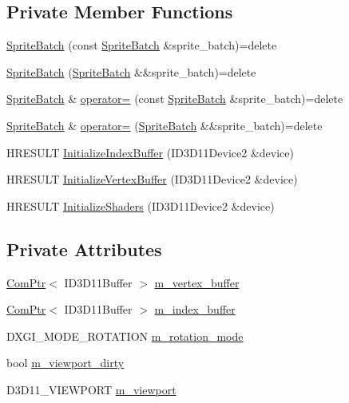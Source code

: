 \subsection*{Private Member Functions}
\begin{DoxyCompactItemize}
\item 
\hyperlink{classmage_1_1_sprite_batch_a10fe1d6cf1d2de9e087b370e7d696be8}{Sprite\+Batch} (const \hyperlink{classmage_1_1_sprite_batch}{Sprite\+Batch} \&sprite\+\_\+batch)=delete
\item 
\hyperlink{classmage_1_1_sprite_batch_a270604c9a535cc4fde6e5ff32b58618f}{Sprite\+Batch} (\hyperlink{classmage_1_1_sprite_batch}{Sprite\+Batch} \&\&sprite\+\_\+batch)=delete
\item 
\hyperlink{classmage_1_1_sprite_batch}{Sprite\+Batch} \& \hyperlink{classmage_1_1_sprite_batch_aa2a5df588d7589a36b38b35dc8a08a48}{operator=} (const \hyperlink{classmage_1_1_sprite_batch}{Sprite\+Batch} \&sprite\+\_\+batch)=delete
\item 
\hyperlink{classmage_1_1_sprite_batch}{Sprite\+Batch} \& \hyperlink{classmage_1_1_sprite_batch_ad46c172200bf47c10fa13fb3a70a4104}{operator=} (\hyperlink{classmage_1_1_sprite_batch}{Sprite\+Batch} \&\&sprite\+\_\+batch)=delete
\item 
H\+R\+E\+S\+U\+LT \hyperlink{classmage_1_1_sprite_batch_ae9625c709af19d244d9b7739f64591ed}{Initialize\+Index\+Buffer} (I\+D3\+D11\+Device2 \&device)
\item 
H\+R\+E\+S\+U\+LT \hyperlink{classmage_1_1_sprite_batch_aeb80ebc6472c1244878d6bb49cdfac22}{Initialize\+Vertex\+Buffer} (I\+D3\+D11\+Device2 \&device)
\item 
H\+R\+E\+S\+U\+LT \hyperlink{classmage_1_1_sprite_batch_abceb0e16fb2bb82c9266d3f55befc69a}{Initialize\+Shaders} (I\+D3\+D11\+Device2 \&device)
\end{DoxyCompactItemize}
\subsection*{Private Attributes}
\begin{DoxyCompactItemize}
\item 
\hyperlink{namespacemage_ae74f374780900893caa5555d1031fd79}{Com\+Ptr}$<$ I\+D3\+D11\+Buffer $>$ \hyperlink{classmage_1_1_sprite_batch_a748eb7f2f880e32ff4cfc0b7d6156de7}{m\+\_\+vertex\+\_\+buffer}
\item 
\hyperlink{namespacemage_ae74f374780900893caa5555d1031fd79}{Com\+Ptr}$<$ I\+D3\+D11\+Buffer $>$ \hyperlink{classmage_1_1_sprite_batch_a3e0cfc2be21a137712b3670238aa91fa}{m\+\_\+index\+\_\+buffer}
\item 
D\+X\+G\+I\+\_\+\+M\+O\+D\+E\+\_\+\+R\+O\+T\+A\+T\+I\+ON \hyperlink{classmage_1_1_sprite_batch_ae062f178efe4a3af9c1573f8f8c4deee}{m\+\_\+rotation\+\_\+mode}
\item 
bool \hyperlink{classmage_1_1_sprite_batch_a36c02637431746043ed6549c9b622550}{m\+\_\+viewport\+\_\+dirty}
\item 
D3\+D11\+\_\+\+V\+I\+E\+W\+P\+O\+RT \hyperlink{classmage_1_1_sprite_batch_a3029ab1ee01ccfc69fef88eb78d5bfc0}{m\+\_\+viewport}
\end{DoxyCompactItemize}


